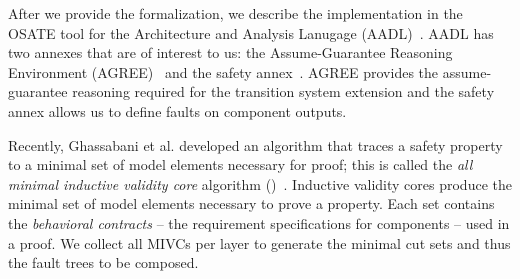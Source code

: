 After we provide the formalization, we describe the implementation in the OSATE tool for the Architecture and Analysis Lanugage (AADL)~\cite{FeilerModelBasedEngineering2012}. AADL has two annexes that are of interest to us: the Assume-Guarantee Reasoning Environment (AGREE)~\cite{NFM2012:CoGaMiWhLaLu} and the safety annex~\cite{stewart2020safety}. AGREE provides the assume-guarantee reasoning required for the transition system extension and the safety annex allows us to define faults on component outputs. 

Recently, Ghassabani et al. developed an algorithm that traces a safety property to a minimal set of model elements necessary for proof; this is called the \textit{all minimal inductive validity core} algorithm (\aivcalg)~\cite{GhassabaniGW16,Ghassabani2017EfficientGO,bendik2018online}. Inductive validity cores produce the minimal set of model elements necessary to prove a property. Each set contains the \emph{behavioral contracts} -- the requirement specifications for components -- used in a proof. We collect all MIVCs per layer to generate the minimal cut sets and thus the fault trees to be composed.




